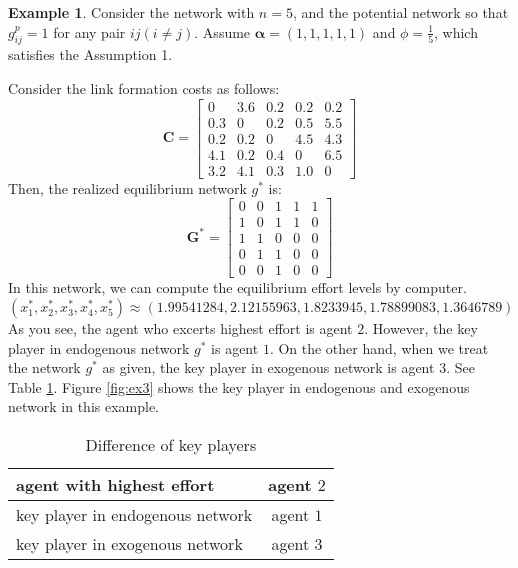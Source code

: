 \documentclass[12pt]{article}
\theoremstyle{definition}
\newtheorem{example}{Example}
\begin{document}
\begin{example}
Consider the network with $n=5$, and the potential network so that $g_{ij}^p = 1$ for any pair $ij(i \neq j)$.
Assume $\bm{\alpha} = (1, 1, 1, 1, 1)$ and $\phi = \frac{1}{5}$, which satisfies the Assumption 1.

Consider the link formation costs as follows:
\[\bm{C} = \left[
			\begin{array}{ccccc}
				0 & 3.6 & 0.2 & 0.2 & 0.2 \\
				0.3 & 0 & 0.2 & 0.5 & 5.5 \\
				0.2 & 0.2 & 0 & 4.5 & 4.3 \\
				4.1 & 0.2 & 0.4 & 0 & 6.5 \\
				3.2 & 4.1 & 0.3 & 1.0 & 0
			\end{array} \right] \]
Then, the realized equilibrium network $g^*$ is:
\[\bm{G}^* = \left[
			\begin{array}{ccccc}
				0 & 0 & 1 & 1 & 1 \\
				1 & 0 & 1 & 1 & 0 \\
				1 & 1 & 0 & 0 & 0 \\
				0 & 1 & 1 & 0 & 0 \\
				0 & 0 & 1 & 0 & 0
			\end{array} \right] \]
In this network, we can compute the equilibrium effort levels by computer.
\[ (x_1^*, x_2^*, x_3^*, x_4^*, x_5^*) \approx (1.99541284, 2.12155963, 1.8233945, 1.78899083, 1.3646789) \]
As you see, the agent who excerts highest effort is agent $2$.
However, the key player in endogenous network $g^*$ is agent $1$.
On the other hand, when we treat the network $g^*$ as given, the key player in exogenous network is agent $3$.
See Table \ref{tab:key player}.
Figure \ref{fig:ex3} shows the key player in endogenous and exogenous network in this example.

\begin{table}[htb]
  \begin{center}
    \begin{tabular}{|l|c|} \hline
      agent with highest effort & agent $2$ \\ \hline
      key player in endogenous network & agent $1$ \\ \hline
      key player in exogenous network & agent $3$ \\ \hline
    \end{tabular}
    \caption{Difference of key players}
    \label{tab:key player}
  \end{center}
\end{table}
\end{example}
\end{document}
